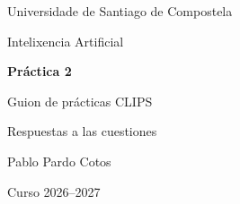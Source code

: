 \documentclass[a4paper,11pt]{article}
\begin{document}
\hypersetup{pageanchor=false}
\begin{titlepage}
  \centering
  \vspace*{2cm}
  {\large Universidade de Santiago de Compostela\par}
  \vspace{0.5cm}
  {Intelixencia Artificial\par}
  \vspace{3cm}
  {\LARGE\bfseries Práctica 2\par}
  \vspace{0.6cm}
  {\Large Guion de prácticas CLIPS\par}
  \vspace{0.3cm}
  {\large Respuestas a las cuestiones\par}
  \vspace{1cm}
  {\large Pablo Pardo Cotos\par}
  \vfill
  {Curso 2026--2027\par}
  \vspace*{1cm}
\end{titlepage}
\hypersetup{pageanchor=true}
\tableofcontents
\clearpage



\end{document}
